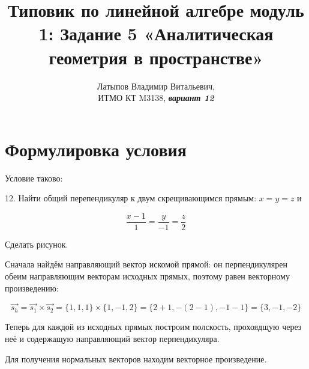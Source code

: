 \documentclass[12pt, a4paper]{article}
\author{Латыпов Владимир Витальевич, \\ ИТМО КТ M3138, \Huge{\textit{\textbf{вариант 12}}}}
\title{Типовик по линейной алгебре модуль 1: Задание 5 «Аналитическая геометрия в пространстве»}
\begin{document}
    \tittoc

    \section{Формулировка условия}

    \begin{statement}
        Условие таково: 
        
        12. Найти общий перепендикуляр к двум скрещивающимся прямым:
        $x = y = z$ и
        
        \begin{equation}
            \frac{x − 1}{1} = \frac{y}{-1} = \frac{z}{2}
        \end{equation}

        Сделать рисунок.
    \end{statement}

    Сначала найдём направляющий вектор искомой прямой: 
    он перпендикулярен обеим направляющим векторам исходных прямых,
    поэтому равен векторному произведению:

    \begin{equation}
        \vec{s_h} = \vec{s_1} \times \vec{s_2} 
        = \{ 1, 1, 1 \} \times \{ 1, -1, 2 \} = 
        \{ 2 + 1, -(2 - 1), -1 - 1 \} = \{ 3, -1, -2 \}
    \end{equation}

    Теперь для каждой из исходных прямых построим полскость, 
    прохоядщую через неё 
    и содержащую направляющий вектор перпендикуляра.

    Для получения нормальных векторов находим векторное произведение.
\end{document}
